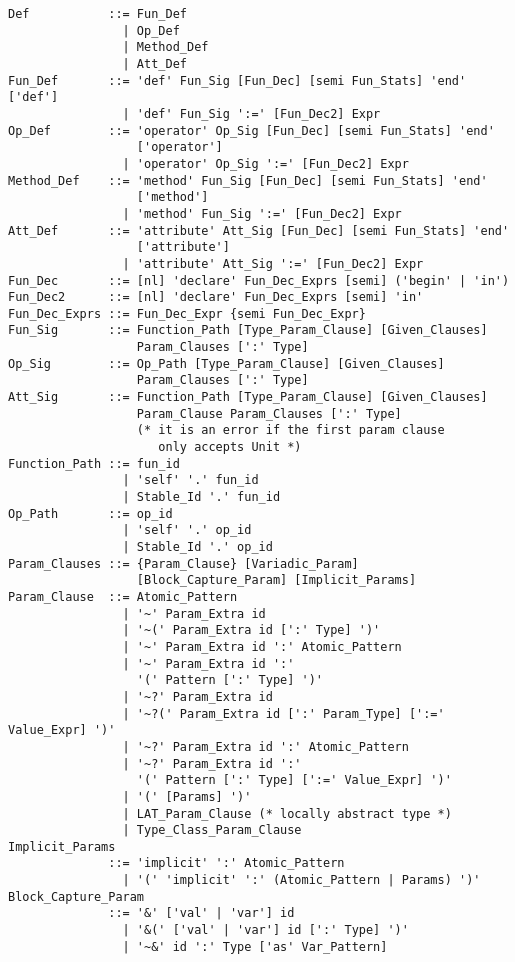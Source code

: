 \begin{lstlisting}
Def           ::= Fun_Def
                | Op_Def
                | Method_Def
                | Att_Def
Fun_Def       ::= 'def' Fun_Sig [Fun_Dec] [semi Fun_Stats] 'end' ['def']
                | 'def' Fun_Sig ':=' [Fun_Dec2] Expr
Op_Def        ::= 'operator' Op_Sig [Fun_Dec] [semi Fun_Stats] 'end' 
                  ['operator']
                | 'operator' Op_Sig ':=' [Fun_Dec2] Expr
Method_Def    ::= 'method' Fun_Sig [Fun_Dec] [semi Fun_Stats] 'end' 
                  ['method']
                | 'method' Fun_Sig ':=' [Fun_Dec2] Expr
Att_Def       ::= 'attribute' Att_Sig [Fun_Dec] [semi Fun_Stats] 'end' 
                  ['attribute']
                | 'attribute' Att_Sig ':=' [Fun_Dec2] Expr
Fun_Dec       ::= [nl] 'declare' Fun_Dec_Exprs [semi] ('begin' | 'in')
Fun_Dec2      ::= [nl] 'declare' Fun_Dec_Exprs [semi] 'in'
Fun_Dec_Exprs ::= Fun_Dec_Expr {semi Fun_Dec_Expr}
Fun_Sig       ::= Function_Path [Type_Param_Clause] [Given_Clauses]
                  Param_Clauses [':' Type]
Op_Sig        ::= Op_Path [Type_Param_Clause] [Given_Clauses]
                  Param_Clauses [':' Type]
Att_Sig       ::= Function_Path [Type_Param_Clause] [Given_Clauses]
                  Param_Clause Param_Clauses [':' Type]
                  (* it is an error if the first param clause
                     only accepts Unit *)
Function_Path ::= fun_id
                | 'self' '.' fun_id
                | Stable_Id '.' fun_id
Op_Path       ::= op_id
                | 'self' '.' op_id
                | Stable_Id '.' op_id
Param_Clauses ::= {Param_Clause} [Variadic_Param]
                  [Block_Capture_Param] [Implicit_Params]
Param_Clause  ::= Atomic_Pattern
                | '~' Param_Extra id
                | '~(' Param_Extra id [':' Type] ')'
                | '~' Param_Extra id ':' Atomic_Pattern
                | '~' Param_Extra id ':' 
                  '(' Pattern [':' Type] ')'
                | '~?' Param_Extra id
                | '~?(' Param_Extra id [':' Param_Type] [':=' Value_Expr] ')'
                | '~?' Param_Extra id ':' Atomic_Pattern
                | '~?' Param_Extra id ':' 
                  '(' Pattern [':' Type] [':=' Value_Expr] ')'
                | '(' [Params] ')'
                | LAT_Param_Clause (* locally abstract type *)
                | Type_Class_Param_Clause
Implicit_Params 
              ::= 'implicit' ':' Atomic_Pattern
                | '(' 'implicit' ':' (Atomic_Pattern | Params) ')'
Block_Capture_Param
              ::= '&' ['val' | 'var'] id
                | '&(' ['val' | 'var'] id [':' Type] ')'
                | '~&' id ':' Type ['as' Var_Pattern]

\end{lstlisting}
